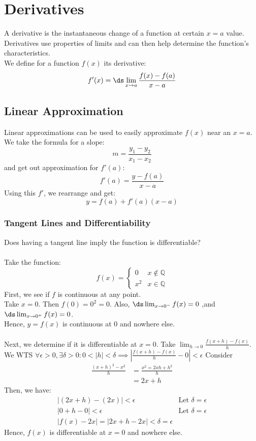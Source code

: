 \documentclass{article}
\begin{document}
\section{Derivatives}
A derivative is the instantaneous change of a function at certain $x = a$ value. Derivatives use properties of limits and can then help determine the function's characteristics.\\
We define for a function $f(x)$ its derivative:
$$f'(x) = \ds \lim_{x \to a}\frac{f(x) - f(a)}{x - a}$$

\subsection{Linear Approximation}
Linear approximations can be used to easily approximate $f(x)$ near an $x = a$.\\
We take the formula for a slope:
$$m = \frac{y_1 - y_2}{x_1 - x_2}$$
and get out approximation for $f'(a)$:
$$f'(a) = \frac{y - f(a)}{x - a}$$
Using this $f'$, we rearrange and get: $$y = f(a) + f'(a)(x-a)$$

\subsubsection{Tangent Lines and Differentiability}
Does having a tangent line imply the function is differentiable?\\
\\
Take the function:
$$f(x) = \begin{cases}
0 & x \not\in \mathbb{Q}\\
x^2 & x \in \mathbb{Q}
\end{cases}$$
First, we see if $f$ is continuous at any point.\\
Take $x = 0$. Then $f(0) = 0^2 = 0$. Also,  $\ds \lim_{x \to 0^-} f(x) = 0$ ,and $\ds \lim_{x \to 0^+} f(x) = 0$.\\
Hence, $y = f(x)$ is continuous at $0$ and nowhere else.\\
\\
Next, we determine if it is differentiable at $x = 0$.
Take $\lim_{h \to 0} \frac{f(x + h) - f(x)}{h}$.
We WTS $\forall \epsilon > 0, \exists \delta > 0 : 0 < |h| < \delta \implies \left| \frac{f(x + h) - f(x)}{h} - 0\right| < \epsilon$
Consider
\begin{align*}
\frac{(x + h)^2 - x^2}{h} & = \frac{x^2 = 2xh + h^2}{h}\\
& = 2x + h
\end{align*}
Then, we have:
\begin{align*}
    \left| (2x + h) - (2x) \right| < \epsilon & \text{Let }\delta = \epsilon\\
    | 0 + h - 0| < \epsilon & \text{Let } \delta = \epsilon\\
    |f(x) - 2x| = |2x +h - 2x| < \delta = \epsilon
\end{align*}
Hence, $f(x)$ is differentiable at $x = 0$ and nowhere else.
\end{document}
